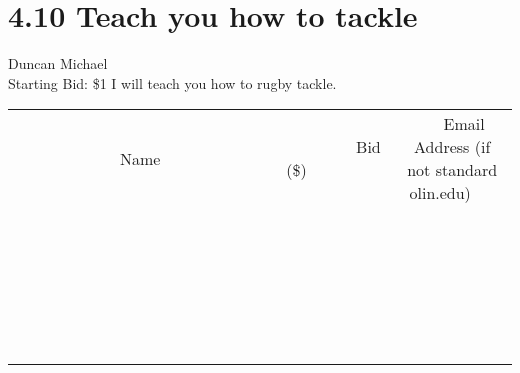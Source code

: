 \documentclass[11pt]{article}
\begin{document}
\section*{4.10 Teach you how to tackle}
Duncan Michael
\\
Starting Bid: \$1
\newline
I will teach you how to rugby tackle.
\\[6ex]
\begin{tabular}{c c c}
~~~~~~~~~~~~~Name~~~~~~~~~~~~~ & ~~~~~~~~~Bid (\$)~~~~~~~~~  & ~~~Email Address (if not standard olin.edu)~~~\\
 & & \\
\hline
 & & \\
\hline
 & & \\
\hline
 & & \\
\hline
 & & \\
\hline
 & & \\
\hline
 & & \\
\hline
 & & \\
\hline
 & & \\
\hline
 & & \\
\hline
 & & \\
\hline
 & & \\
\hline
 & & \\
\hline
 & & \\
\hline
 & & \\
\hline
 & & \\
\hline
 & & \\
\hline
 & & \\
\hline
 & & \\
\hline
 & & \\
\hline
 & & \\
\hline
 & & \\
\hline
 & & \\
\hline
 & & \\
\hline
 & & \\
\hline
 & & \\
\hline
\end{tabular}
\newpage
\end{document}
